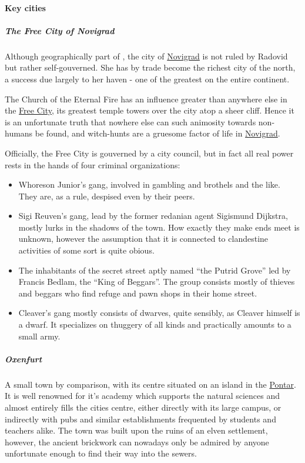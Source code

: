 \documentclass[parskip=full,11pt]{scrreport}
\begin{document}
\paragraph{Key cities}
\subparagraph{The Free City of Novigrad}\label{city:novigrad}
Although geographically part of , the city of \hyperref[city:novigrad]{Novigrad} is not ruled by Radovid but rather self-gouverned.
She has by trade become the richest city of the north, a success due largely to her haven - one of the greatest on the entire continent.

The Church of the Eternal Fire has an influence greater than anywhere else in the \hyperref[city:novigrad]{Free City}, its greatest temple towers over the city atop a sheer cliff.
Hence it is an unfortunate truth that nowhere else can such animosity towards non-humans be found, and witch-hunts are a gruesome factor of life in \hyperref[city:novigrad]{Novigrad}.

Officially, the Free City is gouverned by a city council, but in fact all real power rests in the hands of four criminal organizations:
\begin{itemize}
	\item Whoreson Junior's gang, involved in gambling and brothels and the like. They are, as a rule, despised even by their peers.
	\item Sigi Reuven's gang, lead by the former redanian agent Sigismund Dijkstra, mostly lurks in the shadows of the town.
	      How exactly they make ends meet is unknown, however the assumption that it is connected to clandestine activities of some sort
	      is quite obious.
	\item The inhabitants of the secret street aptly named ``the Putrid Grove'' led by Francis Bedlam, the ``King of Beggars''.
	      The group consists mostly of thieves and beggars who find refuge and pawn shops in their home street.
	\item Cleaver's gang mostly consists of dwarves, quite sensibly, as Cleaver himself is a dwarf. It specializes on thuggery of all
	      kinds and practically amounts to a small army.
\end{itemize}

\subparagraph{Oxenfurt}\label{city:oxenfurt}
A small town by comparison, with its centre situated on an island in the \hyperref[region:pontar]{Pontar}. It is well renowned for it's academy
which supports the natural sciences and almost entirely fills the cities centre, either directly with its large campus, or indirectly
with pubs and similar establishments frequented by students and teachers alike. The town was built upon the ruins of an elven settlement,
however, the ancient brickwork can nowadays only be admired by anyone unfortunate enough to find their way into the sewers.
\end{document}
